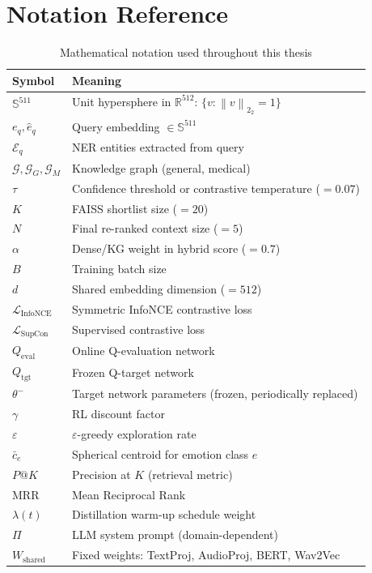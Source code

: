 \documentclass[12pt,a4paper]{article}
\theoremstyle{definition}
\theoremstyle{plain}
\theoremstyle{remark}
\newcommand{\R}{\mathbb{R}}
\newcommand{\Sph}{\mathbb{S}}
\newcommand{\Norm}[1]{\left\|#1\right\|_2}
\newcommand{\Loss}{\mathcal{L}}
\newcommand{\KG}{\mathcal{G}}
\newcommand{\Qeval}{Q_{\text{eval}}}
\newcommand{\Qtgt}{Q_{\text{tgt}}}
\begin{document}
\section{Notation Reference}

\begin{table}[H]
\centering
\caption{Mathematical notation used throughout this thesis}
\begin{tabular}{ll}
\toprule
\textbf{Symbol} & \textbf{Meaning} \\
\midrule
$\Sph^{511}$ & Unit hypersphere in $\R^{512}$: $\{v : \Norm{v}_2 = 1\}$ \\
$e_q, \hat{e}_q$ & Query embedding $\in \Sph^{511}$ \\
$\mathcal{E}_q$ & NER entities extracted from query \\
$\KG, \KG_G, \KG_M$ & Knowledge graph (general, medical) \\
$\tau$ & Confidence threshold or contrastive temperature ($= 0.07$) \\
$K$ & FAISS shortlist size ($= 20$) \\
$N$ & Final re-ranked context size ($= 5$) \\
$\alpha$ & Dense/KG weight in hybrid score ($= 0.7$) \\
$B$ & Training batch size \\
$d$ & Shared embedding dimension ($= 512$) \\
$\Loss_{\text{InfoNCE}}$ & Symmetric InfoNCE contrastive loss \\
$\Loss_{\text{SupCon}}$ & Supervised contrastive loss \\
$\Qeval$ & Online Q-evaluation network \\
$\Qtgt$ & Frozen Q-target network \\
$\theta^-$ & Target network parameters (frozen, periodically replaced) \\
$\gamma$ & RL discount factor \\
$\varepsilon$ & $\varepsilon$-greedy exploration rate \\
$\bar{c}_e$ & Spherical centroid for emotion class $e$ \\
$P@K$ & Precision at $K$ (retrieval metric) \\
$\text{MRR}$ & Mean Reciprocal Rank \\
$\lambda(t)$ & Distillation warm-up schedule weight \\
$\Pi$ & LLM system prompt (domain-dependent) \\
$W_{\text{shared}}$ & Fixed weights: TextProj, AudioProj, BERT, Wav2Vec \\

\end{tabular}
\end{table}
\end{document}
